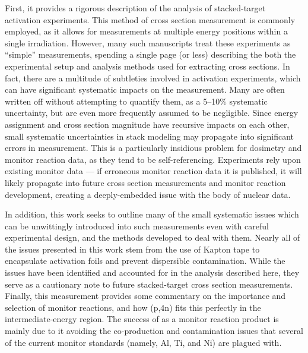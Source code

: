 First, it provides a rigorous  description of the analysis of stacked-target activation experiments.
This method of cross section measurement is commonly employed, as it allows for measurements at multiple energy positions within a single irradiation.
However, many such manuscripts treat these experiments as \enquote{simple} measurements, spending a single page (or less) describing the both the experimental setup and analysis methods used for extracting cross sections.
In fact, there are a multitude of subtleties involved in activation experiments, which can have significant systematic impacts on the measurement.
Many  are often written off without attempting to quantify them, as a 5--10\% systematic uncertainty, but are even more frequently assumed to be negligible. 
Since energy assignment and cross section magnitude have recursive impacts on each other, small systematic uncertainties in stack modeling may 
propagate into significant errors in measurement.
This is a particularly insidious problem for dosimetry and monitor reaction data, as they tend to be self-referencing.
Experiments rely upon existing monitor data --- if erroneous monitor reaction data it is published, it will likely propagate into future cross section measurements and monitor reaction development, creating a deeply-embedded issue with the body of nuclear data.


In addition, this work seeks to outline many of the small systematic issues which can be unwittingly introduced into such measurements even with careful experimental design, and the methods developed to deal with them.
Nearly all of the issues presented in this work stem from the use of Kapton tape to encapsulate activation foils and prevent dispersible contamination.
While the issues have been identified and accounted for in the analysis described here, they serve as a cautionary note to future stacked-target cross section measurements.
Finally, this measurement provides some commentary on the importance and selection of monitor reactions, and how (p,4n) fits this perfectly in the intermediate-energy region.
The success of  as a monitor reaction product is mainly due to it avoiding the co-production and contamination issues that several of the current monitor standards (namely, Al, Ti, and Ni) are plagued with.



